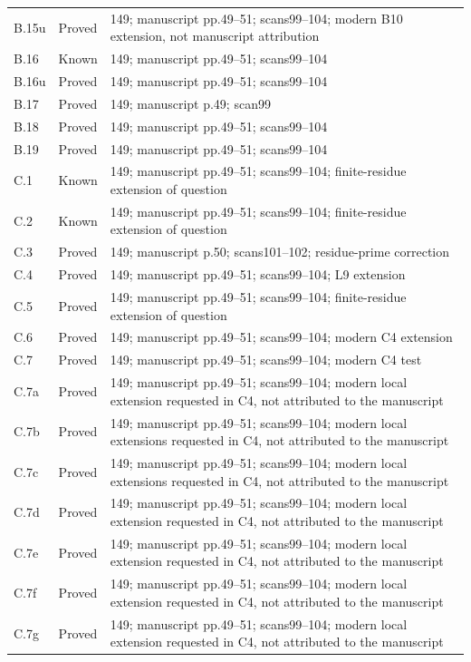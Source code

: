 {\begin{longtable}{p{1.9cm}p{1.7cm}p{10.3cm}}
B.15u & Proved & 149; manuscript pp.49–51; scans99–104; modern B10 extension, not manuscript attribution \\
B.16 & Known & 149; manuscript pp.49–51; scans99–104 \\
B.16u & Proved & 149; manuscript pp.49–51; scans99–104 \\
B.17 & Proved & 149; manuscript p.49; scan99 \\
B.18 & Proved & 149; manuscript pp.49–51; scans99–104 \\
B.19 & Proved & 149; manuscript pp.49–51; scans99–104 \\
C.1 & Known & 149; manuscript pp.49–51; scans99–104; finite-residue extension of question \\
C.2 & Known & 149; manuscript pp.49–51; scans99–104; finite-residue extension of question \\
C.3 & Proved & 149; manuscript p.50; scans101–102; residue-prime correction \\
C.4 & Proved & 149; manuscript pp.49–51; scans99–104; L9 extension \\
C.5 & Proved & 149; manuscript pp.49–51; scans99–104; finite-residue extension of question \\
C.6 & Proved & 149; manuscript pp.49–51; scans99–104; modern C4 extension \\
C.7 & Proved & 149; manuscript pp.49–51; scans99–104; modern C4 test \\
C.7a & Proved & 149; manuscript pp.49–51; scans99–104; modern local extension requested in C4, not attributed to the manuscript \\
C.7b & Proved & 149; manuscript pp.49–51; scans99–104; modern local extensions requested in C4, not attributed to the manuscript \\
C.7c & Proved & 149; manuscript pp.49–51; scans99–104; modern local extensions requested in C4, not attributed to the manuscript \\
C.7d & Proved & 149; manuscript pp.49–51; scans99–104; modern local extension requested in C4, not attributed to the manuscript \\
C.7e & Proved & 149; manuscript pp.49–51; scans99–104; modern local extension requested in C4, not attributed to the manuscript \\
C.7f & Proved & 149; manuscript pp.49–51; scans99–104; modern local extension requested in C4, not attributed to the manuscript \\
C.7g & Proved & 149; manuscript pp.49–51; scans99–104; modern local extension requested in C4, not attributed to the manuscript \\

\end{longtable}}
